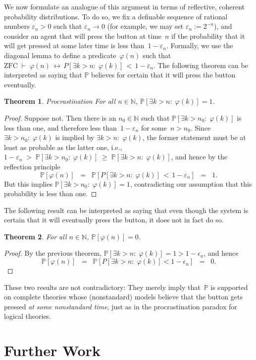 \documentclass[12pt]{article}
\newcommand{\PP}{\mathbb{P}}
\newcommand{\vp}{\varphi}
\newcommand{\NN}{\mathbb{N}}
\newcommand{\zfc}{\mathrm{ZFC}}
\theoremstyle{plain}
\newtheorem{theorem}{Theorem}[subsection]
\theoremstyle{definition}
\theoremstyle{remark}
\begin{document}
We now formulate an analogue of this argument in terms of reflective, coherent probability  distributions.
To do so, we fix a definable sequence of rational numbers $\varepsilon_n > 0$ such that $\varepsilon_n\to0$ (for example, we may set $\varepsilon_n := 2^{-n}$), and consider an agent that will press the button at time~$n$ if the probability that it will get pressed at some later time is less than~$1-\varepsilon_n$. Formally, we use the diagonal lemma to define a predicate~$\vp(n)$ such that $\zfc\;\vdash\;\vp(n)\,\leftrightarrow\, P[\exists k>n{:}\;\vp(k)] \,<\, 1 - \varepsilon_n$.
The following theorem can be interpreted as saying that $\PP$ believes for certain that it will press the button eventually.
\begin{theorem} \emph{Procrastination}
For all $n\in\NN$, $\PP[\exists k>n{:}\;\vp(k)] = 1$.
\end{theorem}
\begin{proof}
Suppose not. Then there is an $n_0\in\NN$ such that $\PP[\exists k>n_0{:}\;\vp(k)]$ is less than one, and therefore less than~$1 - \varepsilon_n$ for some~$n>n_0$. Since $\exists k>n_0{:}\;\vp(k)$ is implied by $\exists k>n{:}\; \vp(k)$, the former statement must be at least as probable as the latter one, i.e., $1 - \varepsilon_n \;>\; \PP[\exists k>n_0{:}\; \vp(k)] \;\ge\; \PP[\exists k>n{:}\;\vp(k)]$, and hence by the reflection principle
\[
\PP[\vp(n)] \;\;=\;\; \PP[P[\exists k>n{:}\;\vp(k)] \,<\, 1 - \varepsilon_n] \;\;=\;\; 1.
\]
But this implies $\PP[\exists k>n_0{:}\;\vp(k)] = 1$, contradicting our assumption that this probability is less than one.
\end{proof}
The following result can be interpreted as saying that even though the system is certain that it will eventually press the button, it does not in fact do so.
\begin{theorem}
For all $n\in\NN$, $\PP[\vp(n)] = 0$.
\end{theorem}
\begin{proof}
By the previous theorem, $\PP[\exists k>n{:}\;\vp(k)] = 1 > 1 - \epsilon_n$, and hence
\[
\PP[\vp(n)] \;\;=\;\; \PP[P[\exists k>n{:}\;\vp(k)] < 1 - \epsilon_n] \;\;=\;\; 0.
\]
\end{proof}
These two results are not contradictory: They merely imply that~$\PP$ is supported on complete theories whose (nonstandard) models believe that the button gets pressed \emph{at some nonstandard time}, just as in the procrastination paradox for logical theories.
\section{Further Work}
\label{further-work}
\end{document}
